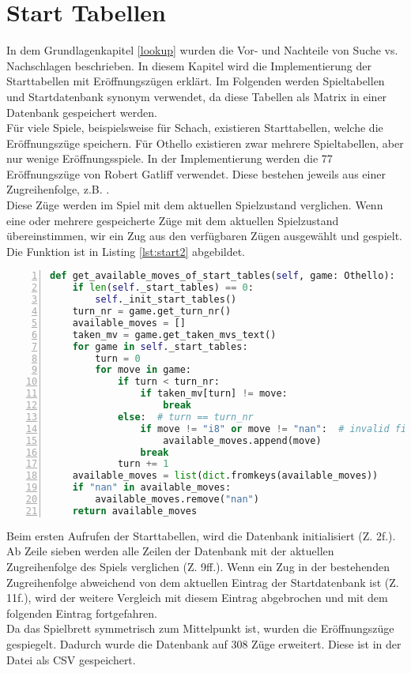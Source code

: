\section{Start Tabellen}
In dem Grundlagenkapitel \ref{lookup} wurden die Vor- und Nachteile von Suche vs. Nachschlagen beschrieben. In diesem Kapitel wird die Implementierung der Starttabellen mit Eröffnungszügen erklärt. Im Folgenden werden Spieltabellen und Startdatenbank synonym verwendet, da diese Tabellen als Matrix in einer Datenbank gespeichert werden.
\\Für viele Spiele, beispielsweise für Schach, existieren Starttabellen, welche die  Eröffnungszüge speichern. Für Othello existieren zwar mehrere Spieltabellen, aber nur wenige Eröffnungsspiele. In der Implementierung werden die 77 Eröffnungszüge von Robert Gatliff \cite{open1} verwendet. Diese bestehen jeweils aus einer Zugreihenfolge, z.B. . 
\\Diese Züge werden im Spiel mit dem aktuellen Spielzustand verglichen. Wenn eine oder mehrere gespeicherte Züge mit dem aktuellen Spielzustand übereinstimmen, wir ein Zug aus den verfügbaren Zügen ausgewählt und gespielt. Die Funktion  ist in Listing \ref{lst:start2} abgebildet.
\begin{lstlisting}[caption = {Befüllen der Datenbank 2}, language = python, captionpos = t , numbers=left, label={lst:start2}]
def get_available_moves_of_start_tables(self, game: Othello):
	if len(self._start_tables) == 0:
		self._init_start_tables()
	turn_nr = game.get_turn_nr()
	available_moves = []
	taken_mv = game.get_taken_mvs_text()
	for game in self._start_tables:
		turn = 0
		for move in game:
			if turn < turn_nr:
				if taken_mv[turn] != move:
					break
			else:  # turn == turn_nr
				if move != "i8" or move != "nan":  # invalid field
					available_moves.append(move)
				break
			turn += 1
	available_moves = list(dict.fromkeys(available_moves))
	if "nan" in available_moves:
		available_moves.remove("nan")
	return available_moves
\end{lstlisting}
Beim ersten Aufrufen der Starttabellen, wird die Datenbank initialisiert (Z. 2f.). Ab Zeile sieben werden alle Zeilen der Datenbank mit der aktuellen Zugreihenfolge des Spiels verglichen (Z. 9ff.). Wenn ein Zug in der bestehenden Zugreihenfolge abweichend von dem aktuellen Eintrag der Startdatenbank ist (Z. 11f.), wird der weitere Vergleich mit diesem Eintrag abgebrochen und mit dem folgenden Eintrag fortgefahren.
\\Da das Spielbrett symmetrisch zum Mittelpunkt ist, wurden die Eröffnungszüge gespiegelt. Dadurch wurde die Datenbank auf 308 Züge erweitert. Diese ist in der Datei  als CSV gespeichert.
